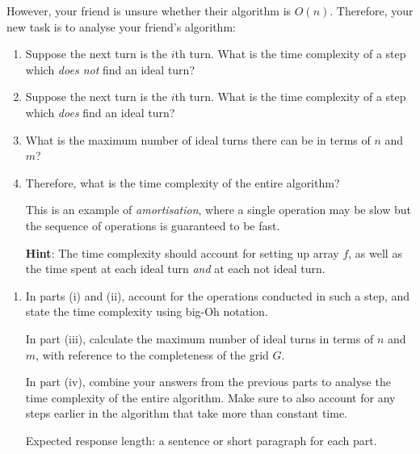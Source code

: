 \documentclass[12pt]{article}
\begin{document}
\begin{question}
\begin{enumerate}
 However, your friend is unsure whether their algorithm is $O(n)$. Therefore, your new task is to analyse your friend's algorithm:
     
\begin{enumerate}
     \item  Suppose the next turn is the $i$th turn. What is the time complexity of a step which \emph{does not} find an ideal turn? 
     \item Suppose the next turn is the $i$th turn.  What is the time complexity of a step which \emph{does} find an ideal turn?
    \item What is the maximum number of ideal turns there can be in terms of $n$ and $m$?
    
    \item Therefore, what is the time complexity of the entire algorithm?

    This is an example of \emph{amortisation}, where a single operation may be slow but the sequence of operations is guaranteed to be fast.
    
    \textbf{Hint}: The time complexity should account for setting up array $f$, as well as the time spent at each ideal turn \emph{and} at each not ideal turn.
\end{enumerate}
\end{enumerate}
\end{question}

\begin{rubric}
\begin{enumerate}
\item In parts (i) and (ii), account for the operations conducted in such a step, and state the time complexity using big-Oh notation.

In part (iii), calculate the maximum number of ideal turns in terms of $n$ and $m$, with reference to the completeness of the grid $G$.

In part (iv), combine your answers from the previous parts to analyse the time complexity of the entire algorithm. Make sure to also account for any steps earlier in the algorithm that take more than constant time.

    Expected response length: a sentence or short paragraph for each part.
\end{enumerate}
\end{rubric}
\begin{solution}
\end{solution}
\begin{attribution}
    
\end{attribution}
\end{document}
